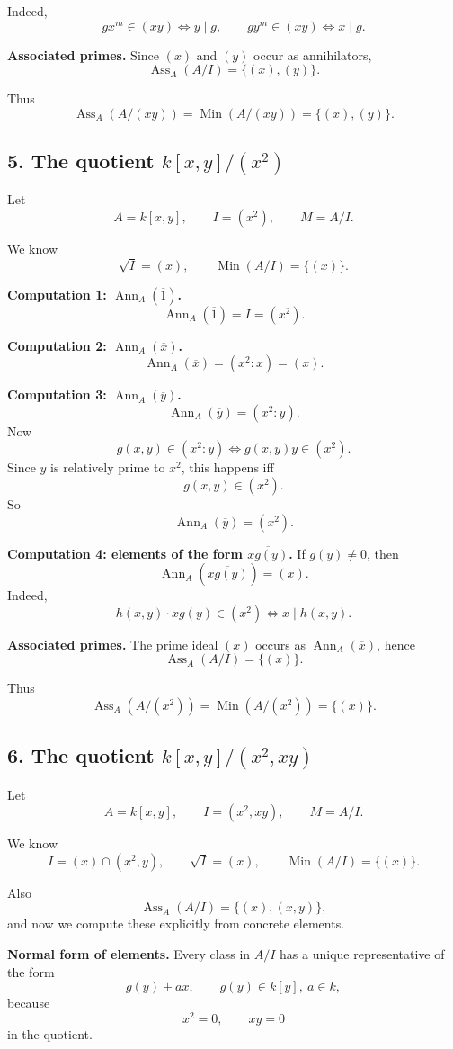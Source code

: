 \documentclass[12pt,a4paper]{article}
\theoremstyle{notespace}
\DeclareMathOperator{\Ass}{Ass}
\DeclareMathOperator{\Ann}{Ann}
\DeclareMathOperator{\Min}{Min}
\begin{document}
Indeed,
\[
g x^m\in (xy)\iff y\mid g,
\qquad
g y^m\in (xy)\iff x\mid g.
\]

\textbf{Associated primes.}
Since \((x)\) and \((y)\) occur as annihilators,
\[
\Ass_A(A/I)=\{(x),(y)\}.
\]

Thus
\[
\Ass_A(A/(xy))=\Min(A/(xy))=\{(x),(y)\}.
\]

\subsection{5. The quotient \(k[x,y]/(x^2)\)}

Let
\[
A=k[x,y],\qquad I=(x^2),\qquad M=A/I.
\]

We know
\[
\sqrt I=(x),
\qquad
\Min(A/I)=\{(x)\}.
\]

\textbf{Computation 1: \(\Ann_A(\overline 1)\).}
\[
\Ann_A(\overline 1)=I=(x^2).
\]

\textbf{Computation 2: \(\Ann_A(\overline x)\).}
\[
\Ann_A(\overline x)=(x^2:x)=(x).
\]

\textbf{Computation 3: \(\Ann_A(\overline y)\).}
\[
\Ann_A(\overline y)=(x^2:y).
\]
Now
\[
g(x,y)\in (x^2:y)
\iff g(x,y)y\in (x^2).
\]
Since \(y\) is relatively prime to \(x^2\), this happens iff
\[
g(x,y)\in (x^2).
\]
So
\[
\Ann_A(\overline y)=(x^2).
\]

\textbf{Computation 4: elements of the form \(\overline{xg(y)}\).}
If \(g(y)\neq 0\), then
\[
\Ann_A(\overline{xg(y)})=(x).
\]
Indeed,
\[
h(x,y)\cdot xg(y)\in (x^2)
\iff x\mid h(x,y).
\]

\textbf{Associated primes.}
The prime ideal \((x)\) occurs as \(\Ann_A(\overline x)\), hence
\[
\Ass_A(A/I)=\{(x)\}.
\]

Thus
\[
\Ass_A(A/(x^2))=\Min(A/(x^2))=\{(x)\}.
\]

\subsection{6. The quotient \(k[x,y]/(x^2,xy)\)}

Let
\[
A=k[x,y],\qquad I=(x^2,xy),\qquad M=A/I.
\]

We know
\[
I=(x)\cap(x^2,y),
\qquad
\sqrt I=(x),
\qquad
\Min(A/I)=\{(x)\}.
\]

Also
\[
\Ass_A(A/I)=\{(x),(x,y)\},
\]
and now we compute these explicitly from concrete elements.

\medskip

\textbf{Normal form of elements.}
Every class in \(A/I\) has a unique representative of the form
\[
g(y)+ax,
\qquad g(y)\in k[y],\ a\in k,
\]
because
\[
x^2=0,\qquad xy=0
\]
in the quotient.
\end{document}
